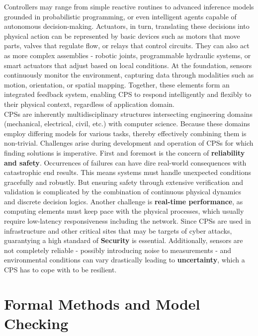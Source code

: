 Controllers may range from simple reactive routines to advanced inference models grounded in probabilistic programming, or even intelligent agents capable of autonomous
decision-making. Actuators, in turn, translating these decisions into physical action can be represented by basic devices such as motors that move parts,
valves that regulate flow, or relays that control circuits. They can also act as more complex assemblies - robotic joints, programmable hydraulic systems, or smart actuators
that adjust based on local conditions. At the foundation, sensors continuously monitor the environment, capturing data through modalities such as motion,
orientation, or spatial mapping. Together, these elements form  an integrated feedback system, enabling CPS to respond intelligently and flexibly to their physical context,
regardless of application domain.\\

CPSs are inherently multidisciplinary structures intersecting engineering domains (mechanical, electrical, civil, etc.) with computer science.
Because these domains employ differing models for various tasks, thereby effectively combining them is non-trivial. Challenges arise during development and operation of CPSs for which
finding solutions is imperative. \cite{cpsChallengesAndFuture} First and foremost is the concern of \textbf{reliability and safety}. Occurrences of failures can have dire real-world
consequences with catastrophic end results. This means systems must handle unexpected conditions gracefully and robustly. But ensuring safety through extensive verification
and validation is complicated by the combination of continuous physical dynamics and discrete decision logics. Another challenge is \textbf{real-time performance}, as computing
elements must keep pace with the physical processes, which usually require low-latency responsiveness including the network. Since CPSs are used in infrastructure and other
critical sites that may be targets of cyber attacks, guarantying a high standard of \textbf{Security} is essential. Additionally, sensors are not completely reliable -
possibly introducing noise to measurements - and environmental conditions can vary drastically leading to \textbf{uncertainty}, which a CPS has to cope with to be resilient. \cite{cpsProbabilisticRobotics}

\label{sec:formal-methods}
\section{Formal Methods and Model Checking}

